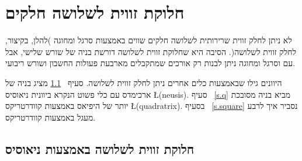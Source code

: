 
\chapter{חלוקת זווית לשלושה חלקים}
\label{c.trisect}


לא ניתן לחלק זווית שרירותית לשלושה חלקים שווים באמצעות סרגל ומחוגה )להלן, בקיצור, לחלק זווית לשלושה(.
הסיבה היא שחלוקת זווית לשלושה דורשת בניה של שורש שלישי, אבל עם  וסרגל ומחוגה ניתן לבנות רק אורכים שמתקבלים מארבעת פעולות החשבון ושורש ריבועי.

היוונים גילו שבאמצעות כלים אחרים ניתן לחלק זווית לשלושה. סעיף~%
\ref{s.neusis}
מציג בניה של ארכימדס עם כלי פשוט הנקרא ביוונית ניאוסיס
\L{(neusis)}.
סעיף~%
\ref{s.q}
מביא בניה מסובכת יותר של היפיאס באמצעות
קוודרטריקס
\L{(quadratrix)}.
בסעיף~%
\ref{s.square}
נסביר איך לרבע מעגל באמצעות קוודרטריקס.



\section{חלוקת זווית לשלושה באמצעות ניאוסיס}\label{s.neusis}

